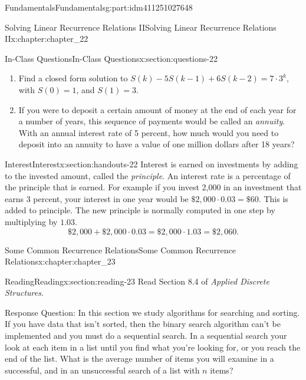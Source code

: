 \documentclass[oneside,10pt,]{book}
\numberwithin{equation}{section}
\begin{document}
\begin{partptx}{Fundamentals}{}{Fundamentals}{}{}{g:part:idm411251027648}
\begin{chapterptx}{Solving Linear Recurrence Relations II}{}{Solving Linear Recurrence Relations II}{}{}{x:chapter:chapter_22}
\begin{sectionptx}{In-Class Questions}{}{In-Class Questions}{}{}{x:section:questions-22}
\begin{enumerate}[label=\arabic*.]
\item{}Find a closed form solution to \(S(k) - 5S(k - 1) + 6S(k - 2) = 7 \cdot 3^k\), with \(S(0) = 1\), and \(S(1) = 3\).%
\item{}If you were to deposit a certain amount of money at the end of each year for a number of years, this sequence of payments would be called an \emph{annuity}.  With an annual interest rate of 5 percent, how much would you need to deposit into an annuity to have a value of one million dollars after 18 years?%
\end{enumerate}
%
\end{sectionptx}
%
%
\typeout{************************************************}
\typeout{************************************************}
%
\begin{sectionptx}{Interest}{}{Interest}{}{}{x:section:handouts-22}
Interest is earned on investments by adding to the invested amount, called the \emph{principle}. An interest rate is a percentage of the principle that is earned.  For example if you invest \textdollar{}2,000 in an investment  that earns 3 percent, your interest in one year would be \(\$2,000\cdot 0.03 =\$60\).  This is added to principle.  The new principle is normally computed in one step by multiplying by \(1.03\).%
\begin{equation*}
\$2,000+ \$2,000\cdot 0.03 =\$2,000\cdot 1.03 =  \$2,060.
\end{equation*}
%
\end{sectionptx}
\end{chapterptx}
%
\typeout{************************************************}
\typeout{************************************************}
%
\begin{chapterptx}{Some Common Recurrence Relations}{}{Some Common Recurrence Relations}{}{}{x:chapter:chapter_23}
\index{}%
%
%
\typeout{************************************************}
\typeout{************************************************}
%
\begin{sectionptx}{Reading}{}{Reading}{}{}{x:section:reading-23}
Read Section 8.4 of \emph{Applied Discrete Structures}.%
\par
Response Question: In this section we study algorithms for searching and sorting.  If you have data that isn't sorted, then the binary search algorithm can't be implemented and you must do a sequential search. In a sequential search your look at each item in a list until you find what you're looking for, or you reach the end of the list.  What is the average number of items you will examine in a successful, and in an unsuccessful search of a list with \(n\) items?%

\end{sectionptx}
\end{chapterptx}
\end{partptx}
\end{document}

